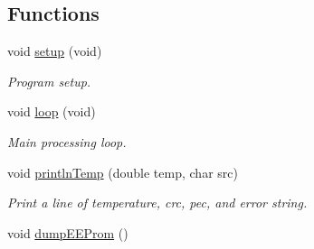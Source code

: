 \subsection*{Functions}
\begin{DoxyCompactItemize}
\item 
\hypertarget{_melexis_test_8ino_a7dfd9b79bc5a37d7df40207afbc5431f}{void \hyperlink{_melexis_test_8ino_a7dfd9b79bc5a37d7df40207afbc5431f}{setup} (void)}\label{_melexis_test_8ino_a7dfd9b79bc5a37d7df40207afbc5431f}

\begin{DoxyCompactList}\small\item\em Program setup. \end{DoxyCompactList}\item 
\hypertarget{_melexis_test_8ino_a0b33edabd7f1c4e4a0bf32c67269be2f}{void \hyperlink{_melexis_test_8ino_a0b33edabd7f1c4e4a0bf32c67269be2f}{loop} (void)}\label{_melexis_test_8ino_a0b33edabd7f1c4e4a0bf32c67269be2f}

\begin{DoxyCompactList}\small\item\em Main processing loop. \end{DoxyCompactList}\item 
void \hyperlink{_melexis_test_8ino_a3906dd03c261bb9c83de87b9988e91ce}{println\-Temp} (double temp, char src)
\begin{DoxyCompactList}\small\item\em Print a line of temperature, crc, pec, and error string. \end{DoxyCompactList}\item 
\hypertarget{_melexis_test_8ino_adf7e43c01edc71026fd6c122cf408817}{void \hyperlink{_melexis_test_8ino_adf7e43c01edc71026fd6c122cf408817}{dump\-E\-E\-Prom} ()}\label{_melexis_test_8ino_adf7e43c01edc71026fd6c122cf408817}


\end{DoxyCompactItemize}
